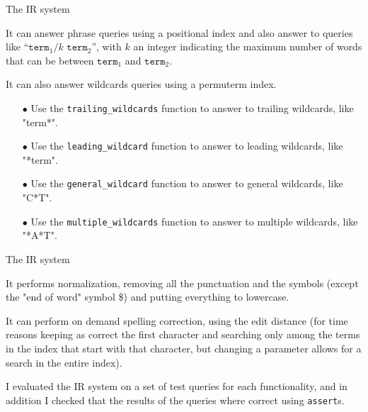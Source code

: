 \documentclass[10pt, aspectratio=169, compress, protectframetitle, handout]{beamer}
\begin{document}
\begin{frame}{The IR system}

    It can answer \alert{phrase queries} using a positional index and also answer to queries like “$\texttt{term}_1 /k \texttt{ term}_2$”, with $k$ an integer indicating the maximum number of words that can be between $\texttt{term}_1$ and $\texttt{term}_2$.

    It can also answer \alert{wildcards queries} using a permuterm index.
    
    \begin{itemize}
        \item[\alert{$\bullet$}] Use the \texttt{trailing\_wildcards} function to answer to trailing wildcards, like "term*".
        \item[\alert{$\bullet$}] Use the \texttt{leading\_wildcard} function to answer to leading wildcards, like "*term".
        \item[\alert{$\bullet$}] Use the \texttt{general\_wildcard} function to answer to general wildcards, like "C*T".
        \item[\alert{$\bullet$}] Use the \texttt{multiple\_wildcards} function to answer to multiple wildcards, like "*A*T".
    \end{itemize}
    
\end{frame}

\begin{frame}{The IR system}

    It performs \alert{normalization}, removing all the punctuation and the symbols (except the "end of word" symbol \$) and putting everything to lowercase.
    
    It can perform on demand \alert{spelling correction}, using the edit distance (for time reasons keeping as correct the first character and searching only among the terms in the index that start with that character, but changing a parameter allows for a search in the entire index).

    I evaluated the IR system on a set of test queries for each functionality, and in addition I checked that the results of the queries where correct using \texttt{assert}s.

\end{frame}
\end{document}
